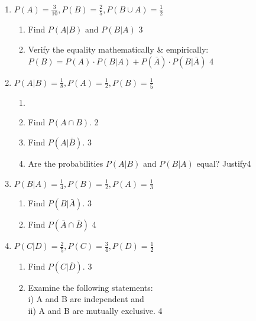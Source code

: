 \documentclass[a4paper,oneside]{book}
\begin{document}
\begin{enumerate}
  \begin{enumerate}
    \item
	What is the minimum value of probability? \hfill 1
    \item
	Why can't probability be negative? Explain with an example or theoretically. \hfill 2
    \item  
	Find $P(A \cap B)$ from the stem. \hfill 3
    \item
	Evaluate the professor's assertion. \hfill 4
  \end{enumerate}

 \item
	  \textbf{$P(A) = \frac{3}{10}, P(B) = \frac 25, P(B\cup A) = \frac12$} 
  
  \begin{enumerate}
    \item  
	Find $P(A \vert B)$ and $P(B \vert A)$ \hfill 3
    \item
	Verify the equality mathematically \& empirically: $P(B) = P(A) \cdot P(B \vert A) + P(\bar A) \cdot P(B \vert \bar A)$ \hfill 4
  \end{enumerate}
  
   \item
  \textbf{$P(A\vert B) = \frac 1 8, P(A) = \frac 12, P(B) = \frac 15$}
 
  \begin{enumerate}
    \item
    \item
    	Find $P(A\cap B)$.  \hfill 2
    \item
    	Find $P(A\vert \bar B)$. \hfill 3
     \item
     	Are the probabilities $P(A\vert B)$ and $P(B\vert A)$ equal? Justify\hfill 4
  \end{enumerate}
  
  \item \textbf{\( P(B \vert A) = \frac{1}{4}, P(B) = \frac{1}{2}, P(A) = \frac{1}{3} \)}

\begin{enumerate}
    \item Find \( P(B \vert \bar{A}) \). \hfill 3
    \item Find $P(\bar A \cap \bar B)$ \hfill 4
\end{enumerate}

\item \textbf{\( P(C \vert D) = \frac{2}{5}, P(C) = \frac{3}{4}, P(D) = \frac{1}{2} \)}

\begin{enumerate}
    \item Find \( P(C \vert \bar{D}) \). \hfill 3
    \item Examine the following statements: \\ i) A and B are independent and \\
    ii) A and B are mutually exclusive. \hfill 4
\end{enumerate}


\end{enumerate}
\end{document}
